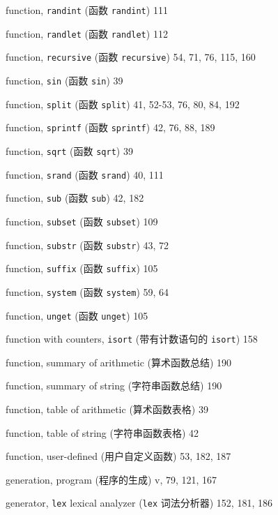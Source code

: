 \begin{multicols}{2}
\hangindent=2pc  function, \verb'randint' (函数 \verb'randint') 111

\hangindent=2pc  function, \verb'randlet' (函数 \verb'randlet') 112

\hangindent=2pc  function, \verb'recursive' (函数 \verb'recursive')
54, 71, 76, 115, 160

\hangindent=2pc  function, \verb'sin' (函数 \verb'sin') 39

\hangindent=2pc  function, \verb'split' (函数 \verb'split')
41, 52-53, 76, 80, 84, 192

\hangindent=2pc  function, \verb'sprintf' (函数 \verb'sprintf')
42, 76, 88, 189

\hangindent=2pc  function, \verb'sqrt' (函数 \verb'sqrt') 39

\hangindent=2pc  function, \verb'srand' (函数 \verb'srand') 40, 111

\hangindent=2pc  function, \verb'sub' (函数 \verb'sub') 42, 182

\hangindent=2pc  function, \verb'subset' (函数 \verb'subset') 109

\hangindent=2pc  function, \verb'substr' (函数 \verb'substr') 43, 72

\hangindent=2pc  function, \verb'suffix' (函数 \verb'suffix') 105

\hangindent=2pc  function, \verb'system' (函数 \verb'system') 59, 64

\hangindent=2pc  function, \verb'unget' (函数 \verb'unget') 105

\hangindent=2pc  function with counters, \verb'isort'
(带有计数语句的 \verb'isort') 158

\hangindent=2pc  function, summary of arithmetic (算术函数总结) 190

\hangindent=2pc  function, summary of string (字符串函数总结) 190

\hangindent=2pc  function, table of arithmetic (算术函数表格) 39

\hangindent=2pc  function, table of string (字符串函数表格) 42

\hangindent=2pc  function, user-defined (用户自定义函数) 53, 182, 187

\hangindent=2pc  generation, program (程序的生成) v, 79, 121, 167

\hangindent=2pc  generator, \verb'lex' lexical analyzer
(\verb'lex' 词法分析器) 152, 181, 186


\end{multicols}
